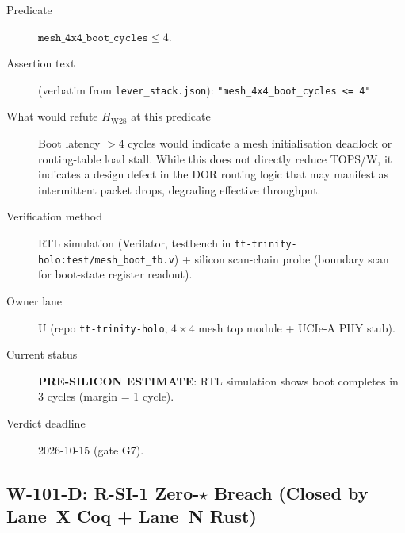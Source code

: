 \begin{description}
  \item[Predicate] \(\mathtt{mesh\_4x4\_boot\_cycles} \leq 4\).
  \item[Assertion text] (verbatim from \texttt{lever\_stack.json}):
    \texttt{"mesh\_4x4\_boot\_cycles <= 4"}
  \item[What would refute \(H_{\mathrm{W28}}\) at this predicate]
    Boot latency \(> 4\) cycles would indicate a mesh initialisation deadlock
    or routing-table load stall.  While this does not directly reduce TOPS/W,
    it indicates a design defect in the DOR routing logic that may manifest as
    intermittent packet drops, degrading effective throughput.
  \item[Verification method] RTL simulation (Verilator, testbench in
    \texttt{tt-trinity-holo:test/mesh\_boot\_tb.v}) + silicon scan-chain probe
    (boundary scan for boot-state register readout).
  \item[Owner lane] U (repo \texttt{tt-trinity-holo}, \(4\times4\) mesh top
    module + UCIe-A PHY stub).
  \item[Current status] \textbf{PRE-SILICON ESTIMATE}: RTL simulation
    shows boot completes in 3 cycles (margin = 1 cycle).
  \item[Verdict deadline] 2026-10-15 (gate G7).
\end{description}

\subsection{W-101-D: R-SI-1 Zero-\(\star\) Breach
  (Closed by Lane~X Coq + Lane~N Rust)}
\label{sec:w101d}

